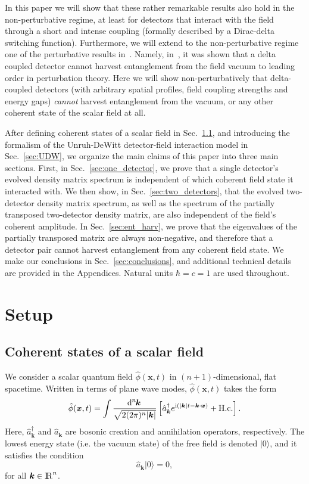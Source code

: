 \documentclass[pra,nofootinbib,floats,aps,twocolumn,tightenlines,superscriptaddress]{revtex4-1}
\renewcommand*\d[2][]{%
	\mathrm{d}%
	\ifx\relax#1\relax\else
	\rule{-0.02em}{1.5ex}^{#1}\rule{0.08em}{0ex}\!
	\fi
	#2\,
}
\newcommand{\ket}[1]{| {#1} \rangle}
\newcommand{\ii}{\mathrm{i}}
\renewcommand{\a}[1]{\hat{a}_{\bm{#1}}}
\newcommand{\ad}[1]{\hat{a}_{\bm{#1}}^\dagger}
\begin{document}
In this paper we will show that these rather remarkable results also hold in the non-perturbative regime, at least for detectors that interact with the field through a short and intense coupling (formally described by a Dirac-delta switching function). Furthermore, we will extend to the non-perturbative regime one of the perturbative results in~\cite{Pozas2017}. Namely, in~\cite{Pozas2017}, it was shown that a delta coupled detector cannot harvest entanglement from the field vacuum to leading order in perturbation theory. Here we will show non-perturbatively that delta-coupled detectors (with arbitrary spatial profiles, field coupling strengths and energy gaps) \textit{cannot} harvest entanglement from the vacuum, or any other coherent state of the scalar field at all.

After defining coherent states of a scalar field in Sec.~\ref{sec:field}, and introducing the formalism of the Unruh-DeWitt detector-field interaction model in Sec.~\ref{sec:UDW}, we organize the main claims of this paper into three main sections. First, in Sec.~\ref{sec:one_detector}, we prove that a single detector's evolved density matrix spectrum is independent of which coherent field state it interacted with. We then show, in Sec.~\ref{sec:two_detectors}, that the evolved two-detector density matrix spectrum, as well as the spectrum of the partially transposed two-detector density matrix, are also independent of the field's coherent amplitude. In Sec.~\ref{sec:ent_harv}, we prove that the eigenvalues of the partially transposed matrix are always non-negative, and therefore that a detector pair cannot harvest entanglement from any coherent field state. We make our conclusions in Sec.~\ref{sec:conclusions}, and additional technical details are provided in the Appendices. Natural units $\hbar=c=1$ are used throughout.



\section{Setup}
\label{sec:setup}

\subsection{Coherent states of a scalar field}
\label{sec:field}

We consider a scalar quantum field $\hat{\phi}(\bm{x},t)$ in $(n+1)$-dimensional, flat spacetime. Written in terms of plane wave modes, $\hat{\phi}(\bm{x},t)$ takes the form
\begin{equation}
\label{eq:field}
	\hat{\phi}(\bm{x},t)
	=
	\int\frac{\d[n]{\bm{k}}}{\sqrt{2(2\pi)^n |\bm{k}|}}\left[\ad{k} e^{\ii(|\bm{k}|t-\bm{k}\cdot\bm{x})}+\text{H.c.}\right].
\end{equation}
Here, $\ad{k}$ and $\a{k}$ are bosonic creation and annihilation operators, respectively. The lowest energy state (i.e. the vacuum state) of the free field is denoted $\ket{0}$, and it satisfies the condition
\begin{equation}
\label{eq:ground_state}
	\a{k}\ket{0}=0,
\end{equation}
for all $\bm{k}\in {\rm I\!R}^n$. 
\end{document}
